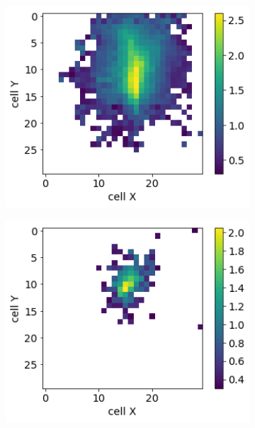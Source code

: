 \begin{figure}
\captionsetup[subfigure]{justification=centering}
  \centering
  \begin{subfigure}{0.24\textwidth}
    \centering
    \includegraphics[width=1\textwidth]{figures/1_real.png}
  \end{subfigure}
  \begin{subfigure}{0.24\textwidth}
    \centering
    \includegraphics[width=1\textwidth]{figures/2_real.png}

\end{subfigure}
\end{figure}
